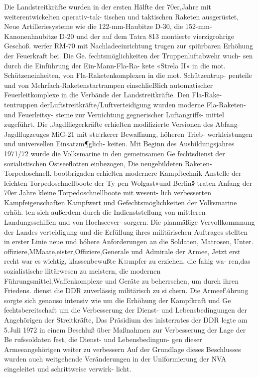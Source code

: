 Die Landstreitkräfte wurden in der ersten Hälfte
der 70er,Jahre mit weiterentwickelten operativ-tak-
tischen und taktischen Raketen ausgerüstet, Neue
Artilleriesysteme wie die 122-mm-Haubitze D-30,
die 152-mm-Kanonenhaubitze D-20 und der auf
dem Tatra 813 montierte vierzigrohrige Geschoß.
werfer RM-70 mit Nachladeeinrichtung trugen zur
spiürbaren Erhöhung der Feuerkraft bei. Die Ge.
fechtsmöglichkeiten der Truppenluftabwehr wuch-
sen durch die Einführung der Ein-Mann-Fla-Ra-
kete «Strela II» in die mot. Schützeneinheiten, von
Fla-Raketenkomplexen in die mot. Schützentrup-
penteile und von Mehrfach-Raketenstartrampen
einschlieBlich automatischer Feuerleitkomplexe in
die Verbände der Landstreitkräfte. Den Fla-Rake-
tentruppen derLuftstreitkräfte/Luftverteidigung
wurden moderne Fla-Raketen-und Feuerleitsy-
steme zur Vernichtung gegnerischer Luftangriffs-
mittel zugeführt. Die ,Jagdfliegerkräfte erhielten
modifizierte Versionen des Abfang-Jagdflugzeuges
MiG-21 mit st¤rkerer Bewaffnung, höheren Trieb-
werkleistungen und universellen Einsatzm¶glich-
keiten.
Mit Beginn des Ausbildungsjahres 1971/72
wurde die Volksmarine in den gemeinsamen Ge
fechtsdienst der sozialistischen Ostseeflotten einbezogen, Die neugebildeten Raketen-Torpedoschnell.
bootbrigaden erhielten modernere Kampftechnik
Anstelle der leichten Torpedoschnellboote der Ty
pen Wolgast»und Berlin》 traten Anfang der
70er Jahre kleine Torpedoschnellboote mit wesent-
lich verbesserten Kampfeigenschaften.Kampfwert
und Gefechtsmöglichkeiten der Volksmarine erhöh.
ten sich außerdem durch die Indienststellung von
mittleren Landungsschiffen und von Hochseever-
sorgern.
Die planmäßige Vervollkommnung der Landes
verteidigung und die Erfüllung ihres militärischen
Auftrages stellten in erster Linie neue und hóhere
Anforderungen an die Soldaten, Matrosen, Unter.
offiziere,MMaate,eister,Offiziere,Generale und
Admirale der Armee, Jetzt erst recht war es wichtig,
klassenbewußte K¤mpfer zu erziehen, die fahig wa-
ren,das sozialistische ilitärwesen zu meistern, die
modernen Führungsmittel,Waffenkomplexe und
Geräte zu beherrschen, um durch ihren Friedens.
dienst die DDR zuverlässig militärisch zu si
chern.
Die Armeef¼hrung sorgte sich genauso intensiv
wie um die Erhöhung der Kampfkraft und Ge
fechtsbereitschaft um die Verbesserung der Dienst-
und Lebensbedingungen der Angehörigen der
Streitkräfte, Das Präsidium des inisterrates der
DDR legte am 5.Juli 1972 in einem Beschluß über
Maßnahmen zur Verbesserung der Lage der Be
rufssoldaten fest, die Dienst- und Lebensbedingun-
gen dieser Armeeangehörigen weiter zu verbessern
Auf der Grundlage dieses Beschlusses wurden auch
weitgehende Veränderungen in der Uniformierung
der NVA eingeleitet und schrittweise verwirk-
licht.